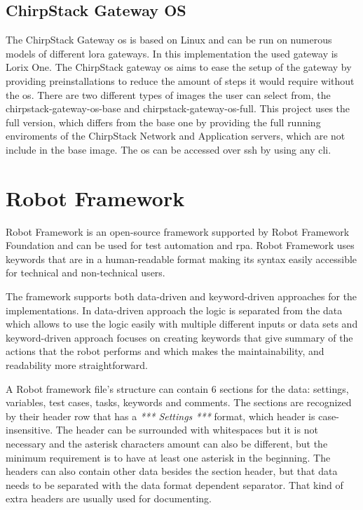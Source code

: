 \subsection{ChirpStack Gateway OS}
The ChirpStack Gateway \gls{os} is based on Linux and can be run on numerous models of different \gls{lora} gateways.
In this implementation the used gateway is Lorix One.
The ChirpStack gateway \gls{os} aims to ease the setup of the gateway by providing preinstallations to reduce the amount of steps it would require without the \gls{os}.
There are two different types of images the user can select from, the chirpstack-gateway-os-base and chirpstack-gateway-os-full.
This project uses the full version, which differs from the base one by providing the full running enviroments of the ChirpStack Network and Application servers, which are not include in the base image.
The \gls{os} can be accessed over \gls{ssh} by using any \gls{cli}.
\cite{chirpstack:gatewayOS}


\section{Robot Framework}
Robot Framework is an open-source framework supported by Robot Framework Foundation and can be used for test automation and \gls{rpa}.
Robot Framework uses keywords that are in a human-readable format making its syntax easily accessible for technical and non-technical users.

\clearpage

The framework supports both data-driven and keyword-driven approaches for the implementations.
In data-driven approach the logic is separated from the data which allows to use the logic easily with multiple different inputs or data sets and keyword-driven approach focuses on creating keywords that give summary of the actions that the robot performs and which makes the maintainability, and readability more straightforward.

A Robot framework file's structure can contain 6 sections for the data: settings, variables, test cases, tasks, keywords and comments.
The sections are recognized by their header row that has a \textit{*** Settings ***} format, which header is case-insensitive. The header can be surrounded with whitespaces but it is not necessary and the asterisk characters amount can also be different, but the minimum requirement is to have at least one asterisk in the beginning.
The headers can also contain other data besides the section header, but that data needs to be separated with the data format dependent separator.
That kind of extra headers are usually used for documenting.


